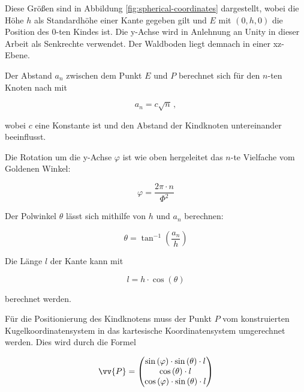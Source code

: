 Diese Größen sind in Abbildung \ref{fig:spherical-coordinates} dargestellt, wobei die Höhe $h$ als Standardhöhe einer Kante gegeben gilt und $E$ mit $(0, h, 0)$ die Position des $0$-ten Kindes ist. Die y-Achse wird in Anlehnung an Unity in dieser Arbeit als Senkrechte verwendet. Der Waldboden liegt demnach in einer xz-Ebene.

Der Abstand $a_n$ zwischen dem Punkt $E$ und $P$ berechnet sich für den $n$-ten Knoten nach \cite{vogel1979better} mit

\begin{equation}
\label{eq:r}
  a_n = c \sqrt{n} \,,
\end{equation}

\noindent wobei $c$ eine Konstante ist und den Abstand der Kindknoten untereinander beeinflusst.

Die Rotation um die y-Achse $\varphi$ ist wie oben hergeleitet das $n$-te Vielfache vom Goldenen Winkel:

\begin{equation}
  \varphi = \frac{2\pi \cdot n}{\Phi^{2}}
\end{equation}

Der Polwinkel $\theta$ lässt sich mithilfe von $h$ und $a_n$ berechnen:

\begin{equation}
  \theta = \tan^{-1} \left(\frac{a_n}{h}\right)
\end{equation}

Die Länge $l$ der Kante kann mit

\begin{equation}
  l = h \cdot \cos\left(\theta\right)
\end{equation}

\noindent  berechnet werden.

Für die Positionierung des Kindknotens muss der Punkt $P$ vom konstruierten Kugelkoordinatensystem in das kartesische Koordinatensystem umgerechnet werden. Dies wird durch die Formel

\begin{equation}
  \vv{P} =
  \begin{pmatrix}
    \sin\left(\varphi\right) \cdot \sin\left(\theta\right) \cdot l\\
    \cos\left(\theta\right) \cdot l\\
    \cos\left(\varphi\right) \cdot \sin\left(\theta\right) \cdot l
  \end{pmatrix}
\end{equation}

